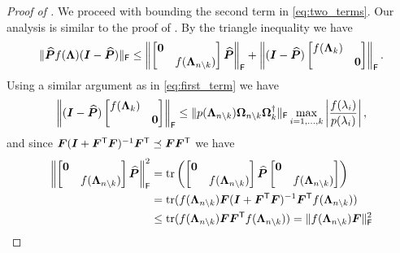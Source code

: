\begin{proof}[Proof of ]
We proceed with bounding the second term in \eqref{eq:two_terms}.
Our analysis is similar to the proof of \cite[Lemma 3.7]{persson_kressner_23}. 
By the triangle inequality we have 
\begin{equation*}
    \|\widehat{\bm{P}} f(\bm{\Lambda})(\bm{I}-\widehat{\bm{P}})\|_{\textsf{\textup{F}}} \leq \left\|\begin{bmatrix} \bm{0} & \\ & f(\bm{\Lambda}_{n \setminus k})\end{bmatrix} \widehat{\bm{P}}\right\|_{\textsf{\textup{F}}} + \left\|(\bm{I} - \widehat{\bm{P}}) \begin{bmatrix} f(\bm{\Lambda}_k) & \\ & \bm{0}\end{bmatrix}\right\|_{\textsf{\textup{F}}}.
\end{equation*}
Using a similar argument as in \eqref{eq:first_term} we have
\begin{equation}
    \left\|(\bm{I} - \widehat{\bm{P}}) \begin{bmatrix} f(\bm{\Lambda}_k) & \\ & \bm{0}\end{bmatrix} \right\|_{\textsf{\textup{F}}} \leq \|p(\bm{\Lambda}_{n \setminus k})\bm{\Omega}_{n \setminus k} \bm{\Omega}_k^{\dagger}\|_{\textsf{\textup{F}}}\max\limits_{i=1,\ldots,k} \left|\frac{f(\lambda_i)}{p(\lambda_i)}\right|,\label{eq:second_term}
\end{equation}
and since $\bm{F}(\bm{I}+\bm{F}^{\textsf{\textup{T}}} \bm{F})^{-1}\bm{F}^{\textsf{\textup{T}}} \preceq \bm{F}\bm{F}^{\textsf{\textup{T}}}$ we have
\begin{align*}
    \left\|\begin{bmatrix} \bm{0} & \\ & f(\bm{\Lambda}_{n \setminus k})\end{bmatrix} \widehat{\bm{P}}\right\|_{\F}^2 
    &= \tr\left(\begin{bmatrix} \bm{0} & \\ & f(\bm{\Lambda}_{n \setminus k})\end{bmatrix} \widehat{\bm{P}}\begin{bmatrix} \bm{0} & \\ & f(\bm{\Lambda}_{n \setminus k})\end{bmatrix}\right) 
    \\&=\tr(f(\bm{\Lambda}_{n \setminus k})\bm{F}(\bm{I} + \bm{F}^\T \bm{F})^{-1}\bm{F}^\T f(\bm{\Lambda}_{n \setminus k}))
    \\&\leq
    \tr(f(\bm{\Lambda}_{n \setminus k})\bm{F}\bm{F}^\T f(\bm{\Lambda}_{n \setminus k}))
    =
    \|f(\bm{\Lambda}_{n \setminus k}) \bm{F}\|_{\F}^2 

\end{align*}
\end{proof}
